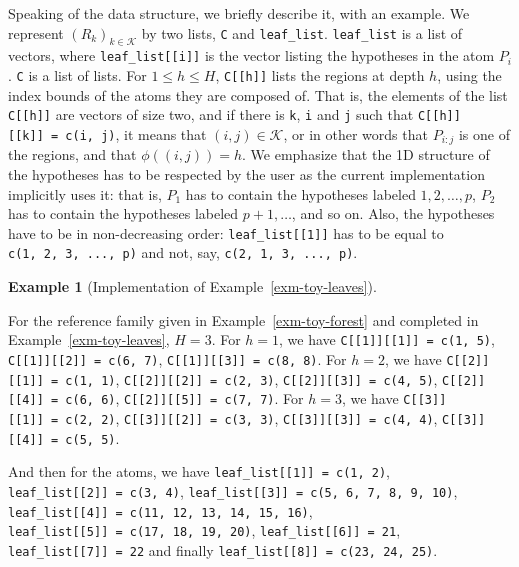 \documentclass[
  11pt,
  a4paper,
]{article}
\theoremstyle{plain}
\theoremstyle{plain}
\theoremstyle{plain}
\theoremstyle{definition}
\theoremstyle{definition}
\newtheorem{example}{Example}[section]
\theoremstyle{remark}
\begin{document}
Speaking of the data structure, we briefly describe it, with an example.
We represent \((R_k)_{k\in\mathcal{K}}\) by two lists, \texttt{C} and
\texttt{leaf\_list}. \texttt{leaf\_list} is a list of vectors, where
\texttt{leaf\_list{[}{[}i{]}{]}} is the vector listing the hypotheses in
the atom \(P_i\). \texttt{C} is a list of lists. For \(1\leq h\leq H\),
\texttt{C{[}{[}h{]}{]}} lists the regions at depth \(h\), using the
index bounds of the atoms they are composed of. That is, the elements of
the list \texttt{C{[}{[}h{]}{]}} are vectors of size two, and if there
is \texttt{k}, \texttt{i} and \texttt{j} such that
\texttt{C{[}{[}h{]}{]}{[}{[}k{]}{]}\ =\ c(i,\ j)}, it means that
\((i, j)\in\mathcal{K}\), or in other words that \(P_{i:j}\) is one of
the regions, and that \(\phi((i, j))=h\). We emphasize that the 1D
structure of the hypotheses has to be respected by the user as the
current implementation implicitly uses it: that is, \(P_1\) has to
contain the hypotheses labeled \(1, 2, \dotsc, p\), \(P_2\) has to
contain the hypotheses labeled \(p+1, \dotsc\), and so on. Also, the
hypotheses have to be in non-decreasing order:
\texttt{leaf\_list{[}{[}1{]}{]}} has to be equal to
\texttt{c(1,\ 2,\ 3,\ ...,\ p)} and not, say,
\texttt{c(2,\ 1,\ 3,\ ...,\ p)}.

\begin{example}[Implementation of
Example~\ref{exm-toy-leaves}]\protect\hypertarget{exm-implementation}{}\label{exm-implementation}

For the reference family given in Example~\ref{exm-toy-forest} and
completed in Example~\ref{exm-toy-leaves}, \(H=3\). For \(h=1\), we have
\texttt{C{[}{[}1{]}{]}{[}{[}1{]}{]}\ =\ c(1,\ 5)},
\texttt{C{[}{[}1{]}{]}{[}{[}2{]}{]}\ =\ c(6,\ 7)},
\texttt{C{[}{[}1{]}{]}{[}{[}3{]}{]}\ =\ c(8,\ 8)}. For \(h=2\), we have
\texttt{C{[}{[}2{]}{]}{[}{[}1{]}{]}\ =\ c(1,\ 1)},
\texttt{C{[}{[}2{]}{]}{[}{[}2{]}{]}\ =\ c(2,\ 3)},
\texttt{C{[}{[}2{]}{]}{[}{[}3{]}{]}\ =\ c(4,\ 5)},
\texttt{C{[}{[}2{]}{]}{[}{[}4{]}{]}\ =\ c(6,\ 6)},
\texttt{C{[}{[}2{]}{]}{[}{[}5{]}{]}\ =\ c(7,\ 7)}. For \(h=3\), we have
\texttt{C{[}{[}3{]}{]}{[}{[}1{]}{]}\ =\ c(2,\ 2)},
\texttt{C{[}{[}3{]}{]}{[}{[}2{]}{]}\ =\ c(3,\ 3)},
\texttt{C{[}{[}3{]}{]}{[}{[}3{]}{]}\ =\ c(4,\ 4)},
\texttt{C{[}{[}3{]}{]}{[}{[}4{]}{]}\ =\ c(5,\ 5)}.

And then for the atoms, we have
\texttt{leaf\_list{[}{[}1{]}{]}\ =\ c(1,\ 2)},
\texttt{leaf\_list{[}{[}2{]}{]}\ =\ c(3,\ 4)},
\texttt{leaf\_list{[}{[}3{]}{]}\ =\ c(5,\ 6,\ 7,\ 8,\ 9,\ 10)},
\texttt{leaf\_list{[}{[}4{]}{]}\ =\ c(11,\ 12,\ 13,\ 14,\ 15,\ 16)},
\texttt{leaf\_list{[}{[}5{]}{]}\ =\ c(17,\ 18,\ 19,\ 20)},
\texttt{leaf\_list{[}{[}6{]}{]}\ =\ 21},
\texttt{leaf\_list{[}{[}7{]}{]}\ =\ 22} and finally
\texttt{leaf\_list{[}{[}8{]}{]}\ =\ c(23,\ 24,\ 25)}.

\end{example}
\end{document}
